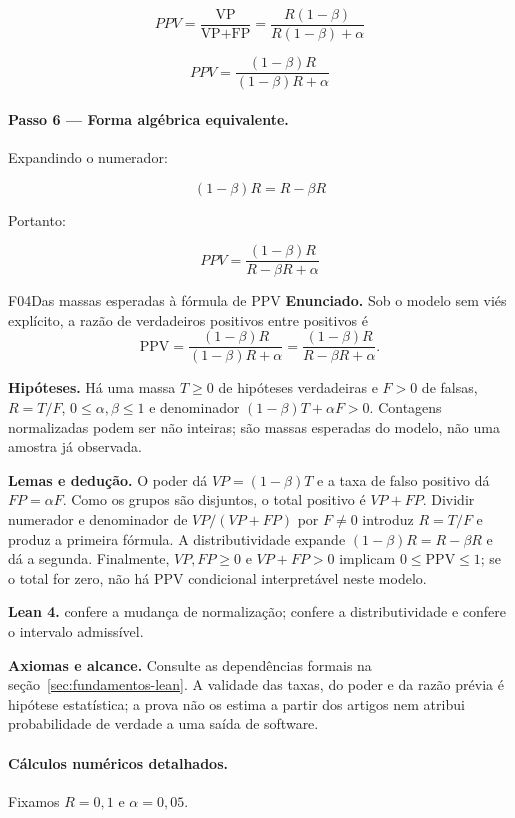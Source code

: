 \begin{metodo}
\[
PPV = \frac{\text{VP}}{\text{VP} + \text{FP}} = \frac{R(1-\beta)}{R(1-\beta) + \alpha}
\]

\[
\boxed{PPV = \frac{(1-\beta)R}{(1-\beta)R + \alpha}}
\]

\paragraph{Passo 6 — Forma algébrica equivalente.}
Expandindo o numerador:

\[
(1-\beta)R = R - \beta R
\]

Portanto:

\[
\boxed{PPV = \frac{(1-\beta)R}{R - \beta R + \alpha}}
\]

\begin{formalizacao}{F04}{Das massas esperadas à fórmula de PPV}
\textbf{Enunciado.} Sob o modelo sem viés explícito, a razão de verdadeiros positivos entre positivos é
\[
\mathrm{PPV}=\frac{(1-\beta)R}{(1-\beta)R+\alpha}
=\frac{(1-\beta)R}{R-\beta R+\alpha}.
\]

\textbf{Hipóteses.} Há uma massa $T\geq0$ de hipóteses verdadeiras e $F>0$ de falsas, $R=T/F$, $0\leq\alpha,\beta\leq1$ e denominador $(1-\beta)T+\alpha F>0$. Contagens normalizadas podem ser não inteiras; são massas esperadas do modelo, não uma amostra já observada.

\textbf{Lemas e dedução.} O poder dá $VP=(1-\beta)T$ e a taxa de falso positivo dá $FP=\alpha F$. Como os grupos são disjuntos, o total positivo é $VP+FP$. Dividir numerador e denominador de $VP/(VP+FP)$ por $F\ne0$ introduz $R=T/F$ e produz a primeira fórmula. A distributividade expande $(1-\beta)R=R-\beta R$ e dá a segunda. Finalmente, $VP,FP\geq0$ e $VP+FP>0$ implicam $0\leq\mathrm{PPV}\leq1$; se o total for zero, não há PPV condicional interpretável neste modelo.

\textbf{Lean 4.}  confere a mudança de normalização;  confere a distributividade e  confere o intervalo admissível.

\textbf{Axiomas e alcance.} Consulte as dependências formais na seção~\ref{sec:fundamentos-lean}. A validade das taxas, do poder e da razão prévia é hipótese estatística; a prova não os estima a partir dos artigos nem atribui probabilidade de verdade a uma saída de software.
\end{formalizacao}

\paragraph{Cálculos numéricos detalhados.} Fixamos $R = 0{,}1$ e $\alpha = 0{,}05$.


\end{metodo}
